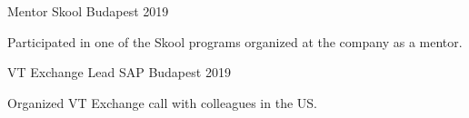 

\begin{cventries}

  \cventry
    {Mentor} %
    {Skool} %
    {Budapest} %
    {2019} %
    {
      \begin{cvitems} %
        \item {Participated in one of the Skool programs organized at the company as a mentor.}
      \end{cvitems}
    }

  \cventry
    {VT Exchange Lead} %
    {SAP} %
    {Budapest} %
    {2019} %
    {
      \begin{cvitems} %
        \item {Organized VT Exchange call with colleagues in the US.}
      \end{cvitems}
    }

\end{cventries}
